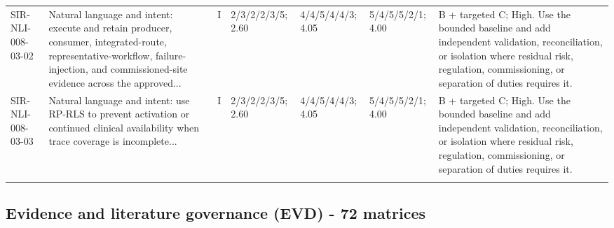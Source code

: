 \documentclass[11pt,letterpaper]{article}
\begin{document}
\begin{scriptsize}
\begin{longtable}{@{}L{0.11\textwidth}L{0.165\textwidth}L{0.04\textwidth}L{0.115\textwidth}L{0.115\textwidth}L{0.115\textwidth}L{0.235\textwidth}@{}}
\addlinespace[2pt]
SIR-NLI-008-03-02 & Natural language and intent: execute and retain producer, consumer, integrated-route, representative-workflow, failure-injection, and commissioned-site evidence across the approved... & I & 2/3/2/2/3/5; 2.60 & 4/4/5/4/4/3; 4.05 & 5/4/5/5/2/1; 4.00 & B + targeted C; High. Use the bounded baseline and add independent validation, reconciliation, or isolation where residual risk, regulation, commissioning, or separation of duties requires it. \\
\addlinespace[2pt]
SIR-NLI-008-03-03 & Natural language and intent: use RP-RLS to prevent activation or continued clinical availability when trace coverage is incomplete... & I & 2/3/2/2/3/5; 2.60 & 4/4/5/4/4/3; 4.05 & 5/4/5/5/2/1; 4.00 & B + targeted C; High. Use the bounded baseline and add independent validation, reconciliation, or isolation where residual risk, regulation, commissioning, or separation of duties requires it. \\
\addlinespace[2pt]
\end{longtable}
\end{scriptsize}

\subsection{Evidence and literature governance (EVD) - 72 matrices}
\end{document}
